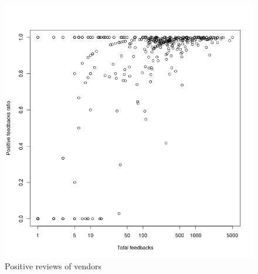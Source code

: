\documentclass[
  digital, %
  table,   %
  lof,     %
  lot,     %
  oneside
]{fithesis3}
\begin{document}
\begin{figure}[!htb]
    \centering
    \includegraphics[scale=0.4]{posratxtotal}
    \caption{Positive reviews of vendors}
    \label{posratxtotal}
\end{figure}
\end{document}
